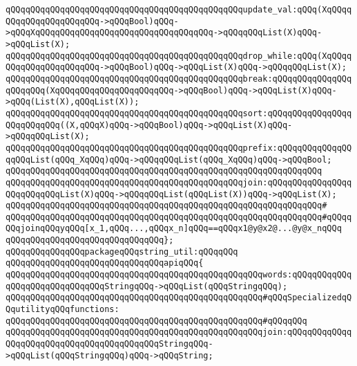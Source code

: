 \verb|qQQqqQQqqQQqqQQqqQQqqQQqqQQqqQQqqQQqqQQqqQQqqQQqupdate_val:qQQq(XqQQqqQQqqQQqqQQqqQQqqQQq->qQQqBool)qQQq->qQQqXqQQqqQQqqQQqqQQqqQQqqQQqqQQqqQQqqQQq->qQQqqQQqList(X)qQQq->qQQqList(X);|\newline
\verb|qQQqqQQqqQQqqQQqqQQqqQQqqQQqqQQqqQQqqQQqqQQqqQQqdrop_while:qQQq(XqQQqqQQqqQQqqQQqqQQqqQQq->qQQqBool)qQQq->qQQqList(X)qQQq->qQQqqQQqList(X);|\newline
\verb|qQQqqQQqqQQqqQQqqQQqqQQqqQQqqQQqqQQqqQQqqQQqqQQqbreak:qQQqqQQqqQQqqQQqqQQqqQQq(XqQQqqQQqqQQqqQQqqQQqqQQq->qQQqBool)qQQq->qQQqList(X)qQQq->qQQq(List(X),qQQqList(X));|\newline
\verb|qQQqqQQqqQQqqQQqqQQqqQQqqQQqqQQqqQQqqQQqqQQqqQQqsort:qQQqqQQqqQQqqQQqqQQqqQQqqQQq((X,qQQqX)qQQq->qQQqBool)qQQq->qQQqList(X)qQQq->qQQqqQQqList(X);|\newline
\newline
\verb|qQQqqQQqqQQqqQQqqQQqqQQqqQQqqQQqqQQqqQQqqQQqqQQqprefix:qQQqqQQqqQQqqQQqqQQqList(qQQq_XqQQq)qQQq->qQQqqQQqList(qQQq_XqQQq)qQQq->qQQqBool;|\newline
\verb|qQQqqQQqqQQqqQQqqQQqqQQqqQQqqQQqqQQqqQQqqQQqqQQqqQQqqQQqqQQqqQQq|\newline
\verb|qQQqqQQqqQQqqQQqqQQqqQQqqQQqqQQqqQQqqQQqqQQqqQQqjoin:qQQqqQQqqQQqqQQqqQQqqQQqqQQqList(X)qQQq->qQQqqQQqList(qQQqList(X))qQQq->qQQqList(X);|\newline
\verb|qQQqqQQqqQQqqQQqqQQqqQQqqQQqqQQqqQQqqQQqqQQqqQQqqQQqqQQqqQQqqQQq#|\newline
\verb|qQQqqQQqqQQqqQQqqQQqqQQqqQQqqQQqqQQqqQQqqQQqqQQqqQQqqQQqqQQqqQQq#qQQqqQQqjoinqQQqyqQQq[x_1,qQQq...,qQQqx_n]qQQq==qQQqx1@y@x2@...@y@x_nqQQq|\newline
\verb|qQQqqQQqqQQqqQQqqQQqqQQqqQQqqQQq};|\newline
\newline
\verb|qQQqqQQqqQQqqQQqpackageqQQqstring_util:qQQqqQQq|\newline
\verb|qQQqqQQqqQQqqQQqqQQqqQQqqQQqqQQqapiqQQq{|\newline
\verb|qQQqqQQqqQQqqQQqqQQqqQQqqQQqqQQqqQQqqQQqqQQqqQQqqQQqwords:qQQqqQQqqQQqqQQqqQQqqQQqqQQqqQQqStringqQQq->qQQqList(qQQqStringqQQq);|\newline
\newline
\verb|qQQqqQQqqQQqqQQqqQQqqQQqqQQqqQQqqQQqqQQqqQQqqQQqqQQq#qQQqSpecializedqQQqutilityqQQqfunctions:|\newline
\verb|qQQqqQQqqQQqqQQqqQQqqQQqqQQqqQQqqQQqqQQqqQQqqQQqqQQq#qQQqqQQq|\newline
\verb|qQQqqQQqqQQqqQQqqQQqqQQqqQQqqQQqqQQqqQQqqQQqqQQqqQQqjoin:qQQqqQQqqQQqqQQqqQQqqQQqqQQqqQQqqQQqqQQqqQQqStringqQQq->qQQqList(qQQqStringqQQq)qQQq->qQQqString;|\newline
